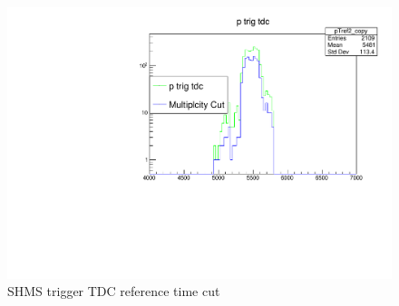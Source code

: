 \documentclass[10pt]{beamer}
\begin{document}
\begin{frame}{}
    \begin{figure}
    \centering
    \includegraphics[width=\textwidth]{p_trig_tdc.pdf}
    \caption{SHMS trigger TDC reference time cut}
\end{figure}{}
\end{frame}{}
\end{document}
